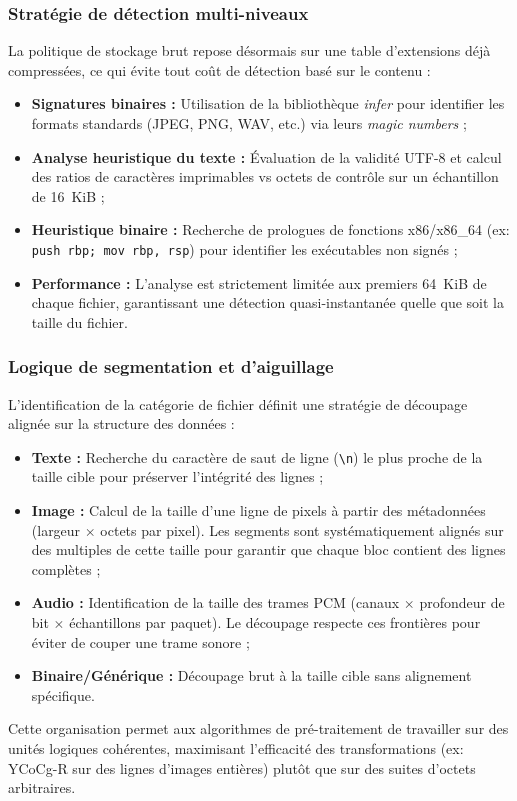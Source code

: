 \documentclass{article}
\begin{document}
\subsubsection*{Stratégie de détection multi-niveaux}

La politique de stockage brut repose désormais sur une table d'extensions déjà compressées, ce qui évite tout coût de détection basé sur le contenu :

\begin{itemize}
    \item \textbf{Signatures binaires :} Utilisation de la bibliothèque \textit{infer} pour identifier les formats standards (JPEG, PNG, WAV, etc.) via leurs \textit{magic numbers} ;
    \item \textbf{Analyse heuristique du texte :} Évaluation de la validité UTF-8 et calcul des ratios de caractères imprimables vs octets de contrôle sur un échantillon de 16~KiB ;
    \item \textbf{Heuristique binaire :} Recherche de prologues de fonctions x86/x86\_64 (ex: \texttt{push rbp; mov rbp, rsp}) pour identifier les exécutables non signés ;
    \item \textbf{Performance :} L'analyse est strictement limitée aux premiers 64~KiB de chaque fichier, garantissant une détection quasi-instantanée quelle que soit la taille du fichier.
\end{itemize}

\subsubsection*{Logique de segmentation et d'aiguillage}

L'identification de la catégorie de fichier définit une stratégie de découpage alignée sur la structure des données :
\begin{itemize}
    \item \textbf{Texte :} Recherche du caractère de saut de ligne (\texttt{\textbackslash n}) le plus proche de la taille cible pour préserver l'intégrité des lignes ;
    \item \textbf{Image :} Calcul de la taille d'une ligne de pixels à partir des métadonnées (largeur $\times$ octets par pixel). Les segments sont systématiquement alignés sur des multiples de cette taille pour garantir que chaque bloc contient des lignes complètes ;
    \item \textbf{Audio :} Identification de la taille des trames PCM (canaux $\times$ profondeur de bit $\times$ échantillons par paquet). Le découpage respecte ces frontières pour éviter de couper une trame sonore ;
    \item \textbf{Binaire/Générique :} Découpage brut à la taille cible sans alignement spécifique.
\end{itemize}
Cette organisation permet aux algorithmes de pré-traitement de travailler sur des unités logiques cohérentes, maximisant l'efficacité des transformations (ex: YCoCg-R sur des lignes d'images entières) plutôt que sur des suites d'octets arbitraires.
\end{document}
